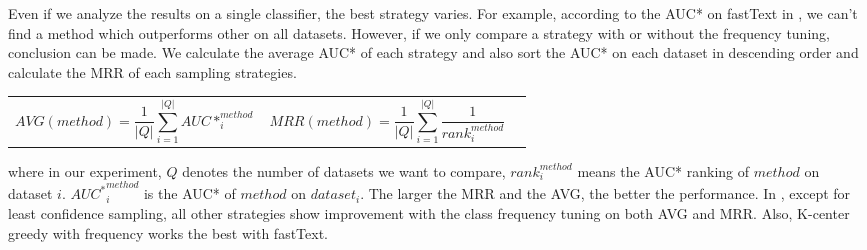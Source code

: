 Even if we analyze the results on a single classifier, 
the best strategy varies. For example, according to the AUC* on 
fastText in , we can't find a method which outperforms 
other on all datasets.  However, if we only compare a strategy with
or without the frequency tuning, conclusion can be made. We calculate the average AUC* of each strategy and also sort the AUC* on each dataset in 
descending order and calculate the MRR of 
each sampling strategies.

\begin{tabularx}{\textwidth}{@{}XXX@{}}
    \footnotesize
	\begin{equation}
	AVG(method) = \frac{1}{|Q|}\sum_{i=1}^{|Q|}AUC*_i^{method}
	\label{eqn:6}
	\end{equation} &
	\footnotesize
	\begin{equation}
	MRR(method) = \frac{1}{|Q|}\sum_{i=1}^{|Q|}\frac{1}{rank_i^{method}}
	\label{eqn:7}
	\end{equation}
\end{tabularx}

\noindent
where in our experiment, $Q$ denotes the number of datasets we want to compare, $rank_i^{method}$ means the AUC* ranking of $method$ on dataset $i$. ${AUC^*}^{method}_{i}$ is the AUC* of $method$ on $dataset_i$.
The larger the MRR and the AVG, the better the performance. In , 
except for least confidence sampling, all other strategies show improvement
with the class frequency tuning on both AVG and MRR.
Also, K-center greedy with frequency works the best with fastText.

